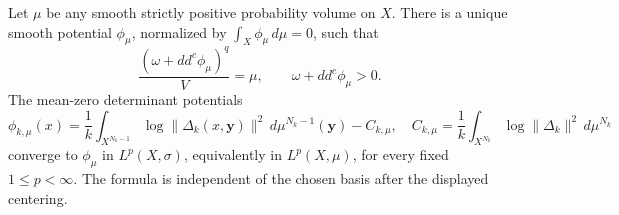 \begin{theorem}
\label{cy:green-formula}
Let $\mu$ be any smooth strictly positive probability volume on $X$.
There is a unique smooth potential $\phi_\mu$, normalized by
$\int_X\phi_\mu\,d\mu=0$, such that
\[
 \frac{(\omega+dd^c\phi_\mu)^q}{V}=\mu,
 \qquad \omega+dd^c\phi_\mu>0.
\]
The mean-zero determinant potentials
\begin{equation}
 \phi_{k,\mu}(x)=\frac1k\int_{X^{N_k-1}}
       \log\|\Delta_k(x,\mathbf y)\|^2\,d\mu^{N_k-1}(\mathbf y)
      -C_{k,\mu},
 \quad
 C_{k,\mu}=\frac1k\int_{X^{N_k}}\log\|\Delta_k\|^2\,d\mu^{N_k}
 \label{cy:potential-formula}
\end{equation}
converge to $\phi_\mu$ in $L^p(X,\sigma)$, equivalently in
$L^p(X,\mu)$, for every fixed $1\le p<\infty$. The formula is independent of the chosen basis after
the displayed centering.
\end{theorem}

